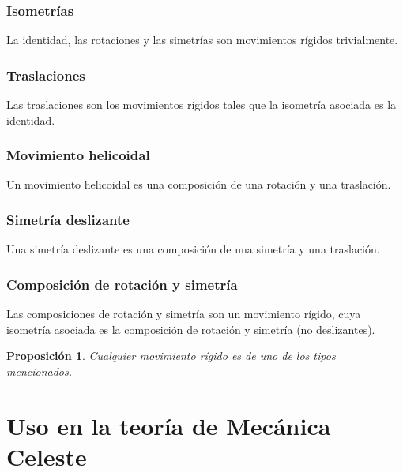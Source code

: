 \documentclass[11pt]{article}
\newtheorem{prop}{Proposición}[section]
\theoremstyle{definition}
\begin{document}
  \subsubsection{Isometrías}
  La identidad, las rotaciones y las simetrías son movimientos rígidos trivialmente.
  \subsubsection{Traslaciones}
  Las traslaciones son los movimientos rígidos tales que la isometría asociada es la identidad.
  \subsubsection{Movimiento helicoidal}
  Un movimiento helicoidal es una composición de una rotación y una traslación.
  \subsubsection{Simetría deslizante}
  Una simetría deslizante es una composición de una simetría y una traslación.
  \subsubsection{Composición de rotación y simetría}
  Las composiciones de rotación y simetría son un movimiento rígido, cuya isometría asociada es la composición de rotación y simetría (no deslizantes).
  
  \begin{prop}
  Cualquier movimiento rígido es de uno de los tipos mencionados.
  \end{prop}
  

\section{Uso en la teoría de Mecánica Celeste}
	
\end{document}
